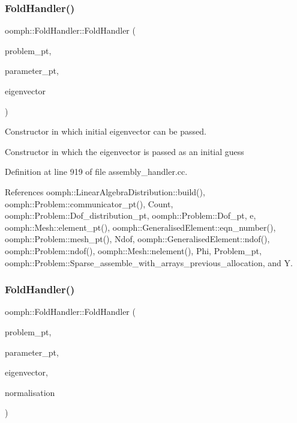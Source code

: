 \subsubsection{\texorpdfstring{Fold\+Handler()}{FoldHandler()}\hspace{0.1cm}{\footnotesize\ttfamily [2/3]}}
{\footnotesize\ttfamily oomph\+::\+Fold\+Handler\+::\+Fold\+Handler (\begin{DoxyParamCaption}\item[{\hyperlink{classoomph_1_1Problem}{Problem} $\ast$const \&}]{problem\+\_\+pt,  }\item[{double $\ast$const \&}]{parameter\+\_\+pt,  }\item[{const \hyperlink{classoomph_1_1DoubleVector}{Double\+Vector} \&}]{eigenvector }\end{DoxyParamCaption})}



Constructor in which initial eigenvector can be passed. 

Constructor in which the eigenvector is passed as an initial guess 

Definition at line 919 of file assembly\+\_\+handler.\+cc.



References oomph\+::\+Linear\+Algebra\+Distribution\+::build(), oomph\+::\+Problem\+::communicator\+\_\+pt(), Count, oomph\+::\+Problem\+::\+Dof\+\_\+distribution\+\_\+pt, oomph\+::\+Problem\+::\+Dof\+\_\+pt, e, oomph\+::\+Mesh\+::element\+\_\+pt(), oomph\+::\+Generalised\+Element\+::eqn\+\_\+number(), oomph\+::\+Problem\+::mesh\+\_\+pt(), Ndof, oomph\+::\+Generalised\+Element\+::ndof(), oomph\+::\+Problem\+::ndof(), oomph\+::\+Mesh\+::nelement(), Phi, Problem\+\_\+pt, oomph\+::\+Problem\+::\+Sparse\+\_\+assemble\+\_\+with\+\_\+arrays\+\_\+previous\+\_\+allocation, and Y.

\mbox{\label{classoomph_1_1FoldHandler_a0e39e588b48269e4f7272b78fa4b99a7}} 
\subsubsection{\texorpdfstring{Fold\+Handler()}{FoldHandler()}\hspace{0.1cm}{\footnotesize\ttfamily [3/3]}}
{\footnotesize\ttfamily oomph\+::\+Fold\+Handler\+::\+Fold\+Handler (\begin{DoxyParamCaption}\item[{\hyperlink{classoomph_1_1Problem}{Problem} $\ast$const \&}]{problem\+\_\+pt,  }\item[{double $\ast$const \&}]{parameter\+\_\+pt,  }\item[{const \hyperlink{classoomph_1_1DoubleVector}{Double\+Vector} \&}]{eigenvector,  }\item[{const \hyperlink{classoomph_1_1DoubleVector}{Double\+Vector} \&}]{normalisation }\end{DoxyParamCaption})}

